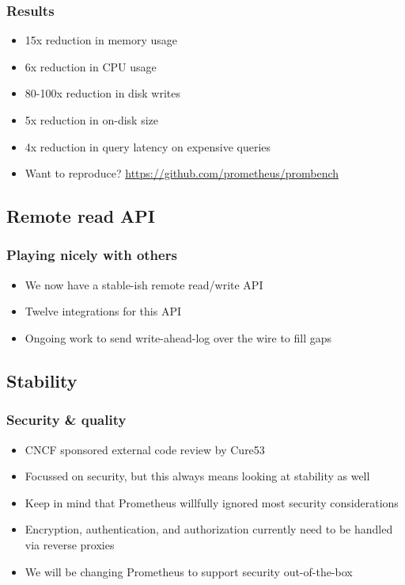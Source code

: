 \documentclass[aspectratio=169]{beamer}
\begin{document}
\begin{frame}
	\frametitle{Results}
	\begin{itemize}
		\item 15x reduction in memory usage
		\item 6x reduction in CPU usage
		\item 80-100x reduction in disk writes
		\item 5x reduction in on-disk size
		\item 4x reduction in query latency on expensive queries
		\item Want to reproduce? \url{https://github.com/prometheus/prombench}
	\end{itemize}
\end{frame}




\subsection{Remote read API}

\begin{frame}
	\frametitle{Playing nicely with others}
	\begin{itemize}
		\item We now have a stable-ish remote read/write API
		\item Twelve integrations for this API
		\item Ongoing work to send write-ahead-log over the wire to fill gaps
	\end{itemize}
\end{frame}


\subsection{Stability}

\begin{frame}
	\frametitle{Security \& quality}
	\begin{itemize}
		\item CNCF sponsored external code review by Cure53
		\item Focussed on security, but this always means looking at stability as well
		\item Keep in mind that Prometheus willfully ignored most security considerations
		\item Encryption, authentication, and authorization currently need to be handled via reverse proxies
		\item We will be changing Prometheus to support security out-of-the-box
	\end{itemize}
\end{frame}
\end{document}
